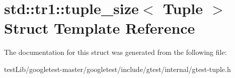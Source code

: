 \hypertarget{structstd_1_1tr1_1_1tuple__size}{}\section{std\+:\+:tr1\+:\+:tuple\+\_\+size$<$ Tuple $>$ Struct Template Reference}
\label{structstd_1_1tr1_1_1tuple__size}


The documentation for this struct was generated from the following file\+:\begin{DoxyCompactItemize}
\item 
test\+Lib/googletest-\/master/googletest/include/gtest/internal/gtest-\/tuple.\+h\end{DoxyCompactItemize}
